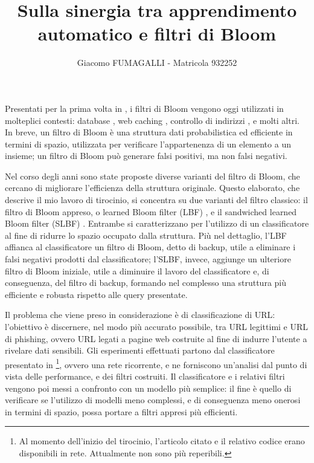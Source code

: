 \documentclass[4apaper,11pt]{article}
\title{Sulla sinergia tra apprendimento automatico e filtri di Bloom}
\author{Giacomo FUMAGALLI - Matricola 932252}
\date{}
\begin{document}
\maketitle
Presentati per la prima volta in \cite{Bloom1970SpacetimeTI}, i filtri di Bloom vengono oggi utilizzati in molteplici contesti: database \cite{kraska2018case}, web caching \cite{Maggs15algorithmicnuggets}, controllo di indirizzi \cite{Dharmapurikar2006LongestPM}, e molti altri. In breve, un filtro di Bloom è una struttura dati probabilistica ed efficiente in termini di spazio, utilizzata per verificare l'appartenenza di un elemento a un insieme; un filtro di Bloom può generare falsi positivi, ma non falsi negativi.

Nel corso degli anni sono state proposte diverse varianti del filtro di Bloom, che cercano di migliorare l'efficienza della struttura originale. Questo elaborato, che descrive il mio lavoro di tirocinio, si concentra su due varianti del filtro classico: il filtro di Bloom appreso, o learned Bloom filter (LBF) \cite{kraska2018case}, e il sandwiched learned Bloom filter (SLBF) \cite{10.5555/3326943.3326986}. Entrambe si caratterizzano per l'utilizzo di un classificatore al fine di ridurre lo spazio occupato dalla struttura. Più nel dettaglio, l'LBF affianca al classificatore un filtro di Bloom, detto di backup, utile a eliminare i falsi negativi prodotti dal classificatore; l'SLBF, invece, aggiunge un ulteriore filtro di Bloom iniziale, utile a diminuire il lavoro del classificatore e, di conseguenza, del filtro di backup, formando nel complesso una struttura più efficiente e robusta rispetto alle query presentate.

Il problema che viene preso in considerazione è di classificazione di URL: l'obiettivo è discernere, nel modo più accurato possibile, tra URL legittimi e URL di phishing, ovvero URL legati a pagine web costruite al fine di indurre l'utente a rivelare dati sensibili. Gli esperimenti effettuati partono dal classificatore presentato in \cite{ma2020}\footnote{Al momento dell'inizio del tirocinio, l'articolo citato e il relativo codice erano disponibili in rete. Attualmente non sono più reperibili.}, ovvero una rete ricorrente, e ne forniscono un'analisi dal punto di vista delle performance, e dei filtri costruiti. Il classificatore e i relativi filtri vengono poi messi a confronto con un modello più semplice: il fine è quello di verificare se l'utilizzo di modelli meno complessi, e di conseguenza meno onerosi in termini di spazio, possa portare a filtri appresi più efficienti.
\end{document}
